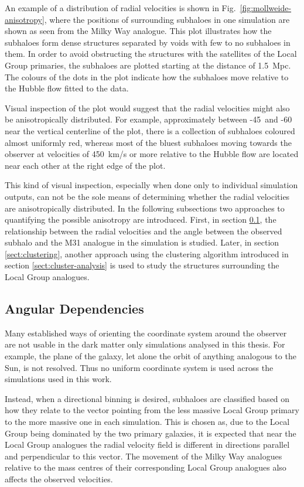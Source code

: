 \documentclass[english, twoside]{HYgradu}
\begin{document}
An example of a distribution of radial velocities is shown in Fig.~\ref{fig:mollweide-anisotropy}, where the positions of surrounding subhaloes in one simulation are shown as seen from the Milky Way analogue. This plot illustrates how the subhaloes form dense structures separated by voids with few to no subhaloes in them. In order to avoid obstructing the structures with the satellites of the Local Group primaries, the subhaloes are plotted starting at the distance of 1.5~Mpc. The colours of the dots in the plot indicate how the subhaloes move relative to the Hubble flow fitted to the data.

Visual inspection of the plot would suggest that the radial velocities might also be anisotropically distributed. For example, approximately between -45\textdegree\ and -60\textdegree\, near the vertical centerline of the plot, there is a collection of subhaloes coloured almost uniformly red, whereas most of the bluest subhaloes moving towards the observer at velocities of 450~km/s or more relative to the Hubble flow are located near each other at the right edge of the plot.

This kind of visual inspection, especially when done only to individual simulation outputs, can not be the sole means of determining whether the radial velocities are anisotropically distributed. In the following subsections two approaches to quantifying the possible anisotropy are introduced. First, in section \ref{sect:angular-dependencies}, the relationship between the radial velocities and the angle between the observed subhalo and the M31 analogue in the simulation is studied. Later, in section \ref{sect:clustering}, another approach using the clustering algorithm introduced in section \ref{sect:cluster-analysis} is used to study the structures surrounding the Local Group analogues.

\subsection{Angular Dependencies}\label{sect:angular-dependencies}
Many established ways of orienting the coordinate system around the observer are not usable in the dark matter only simulations analysed in this thesis. For example, the plane of the galaxy, let alone the orbit of anything analogous to the Sun, is not resolved. Thus no uniform coordinate system is used across the simulations used in this work.

Instead, when a directional binning is desired, subhaloes are classified based on how they relate to the vector pointing from the less massive Local Group primary to the more massive one in each simulation. This is chosen as, due to the Local Group being dominated by the two primary galaxies, it is expected that near the Local Group analogues the radial velocity field is different in directions parallel and perpendicular to this vector. The movement of the Milky Way analogues relative to the mass centres of their corresponding Local Group analogues also affects the observed velocities.
\end{document}
